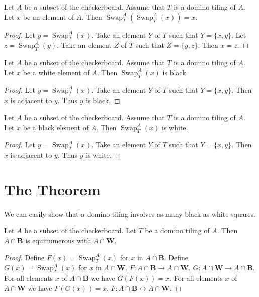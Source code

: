 \documentclass{article}
\newcommand{\Black}{\mathbf{B}}
\newcommand{\White}{\mathbf{W}}
\newcommand{\Sw}[3]{\operatorname{Swap}_{#1}^{#2}(#3)}
\begin{document}
\begin{forthel}
    \begin{lemma}
        Let $A$ be a subset of the checkerboard.
        Assume that $T$ is a domino tiling of $A$.
        Let $x$ be an element of $A$.
        Then $\Sw{T}{A}{\Sw{T}{A}{x}} = x$.
    \end{lemma}
    \begin{proof}
        Let $y = \Sw{T}{A}{x}$.
        Take an element $Y$ of $T$ such that $Y = \{x, y\}$.
        Let $z = \Sw{T}{A}{y}$.
        Take an element $Z$ of $T$ such that $Z = \{y, z\}$.
        Then $x = z$.
    \end{proof}

    \begin{lemma}
        Let $A$ be a subset of the checkerboard.
        Assume that $T$ is a domino tiling of $A$.
        Let $x$ be a white element of $A$.
        Then $\Sw{T}{A}{x}$ is black.
    \end{lemma}
    \begin{proof}
        Let $y = \Sw{T}{A}{x}$.
        Take an element $Y$ of $T$ such that $Y = \{x,y\}$.
        Then $x$ is adjacent to $y$. Thus $y$ is black.
    \end{proof}

    \begin{lemma}
        Let $A$ be a subset of the checkerboard.
        Assume that $T$ is a domino tiling of $A$.
        Let $x$ be a black element of $A$.
        Then $\Sw{T}{A}{x}$ is white.
    \end{lemma}
    \begin{proof}
        Let $y = \Sw{T}{A}{x}$.
        Take an element $Y$ of $T$ such that $Y = \{x,y\}$.
        Then $x$ is adjacent to $y$. Thus $y$ is white.
    \end{proof}
\end{forthel}

\section{The Theorem}

\noindent We can easily show that a domino tiling involves as many black as white squares.

\begin{forthel}
    \begin{lemma}
        Let $A$ be a subset of the checkerboard.
        Let $T$ be a domino tiling of $A$.
        Then $A \cap \Black$ is
        equinumerous with $A \cap \White$.
    \end{lemma}
    \begin{proof}
        Define $F(x) = \Sw{T}{A}{x}$ for $x$ in $A \cap \Black$.
        Define $G(x) = \Sw{T}{A}{x}$ for $x$ in $A \cap \White$.
        $F: A \cap \Black \to A \cap \White$.
        $G: A \cap \White \to A \cap \Black$.
        For all elements $x$ of $A \cap \Black$ we have $G(F(x))=x$.
        For all elements $x$ of $A \cap \White$ we have $F(G(x))=x$.
        $F : A \cap \Black \leftrightarrow A \cap \White$.
    \end{proof}
\end{forthel}
\end{document}
